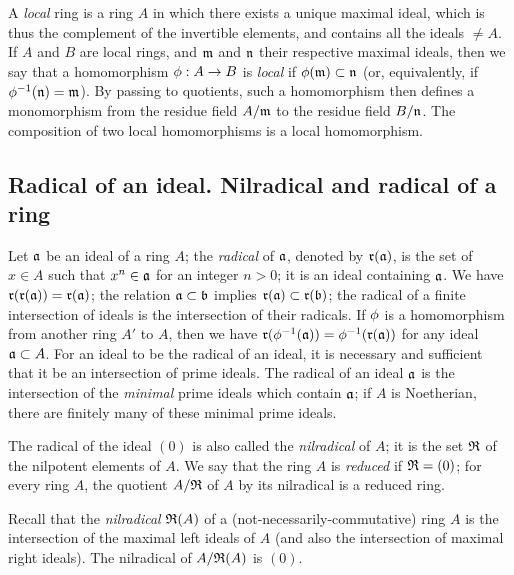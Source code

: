 \begin{env}[1.0.7]
\label{0.1.0.7}
A \emph{local} ring is a ring $A$ in which there exists a unique maximal ideal, which is thus the complement of the invertible elements, and contains all the ideals $\neq A$.
If $A$ and $B$ are local rings, and $\mathfrak{m}$ and $\mathfrak{n}$ their respective maximal ideals, then we say that a homomorphism $\vphi:A\to B$ is \emph{local} if $\phi(\mathfrak{m})\subset\mathfrak{n}$ (or, equivalently, if $\phi^{-1}(\mathfrak{n})=\mathfrak{m}$).
By passing to quotients, such a homomorphism then defines a monomorphism from the residue field $A/\mathfrak{m}$ to the residue field $B/\mathfrak{n}$.
The composition of two local homomorphisms is a local homomorphism.
\end{env}

\subsection{Radical of an ideal. Nilradical and radical of a ring}
\label{subsection-radical-and-nilradical}

\begin{env}[1.1.1]
\label{0.1.1.1}
Let $\mathfrak{a}$ be an ideal of a ring $A$;
the \emph{radical} of $\mathfrak{a}$, denoted by $\mathfrak{r}(\mathfrak{a})$, is the set of $x\in A$ such that $x^n\in\mathfrak{a}$ for an integer $n>0$;
it is an ideal containing $\mathfrak{a}$.
We have $\mathfrak{r}(\mathfrak{r}(\mathfrak{a}))=\mathfrak{r}(\mathfrak{a})$;
the relation $\mathfrak{a}\subset\mathfrak{b}$ implies $\mathfrak{r}(\mathfrak{a})\subset\mathfrak{r}(\mathfrak{b})$;
the radical of a finite intersection of ideals is the intersection of their radicals.
If $\phi$ is a homomorphism from another ring $A'$ to $A$, then we have $\mathfrak{r}(\phi^{-1}(\mathfrak{a}))=\phi^{-1}(\mathfrak{r}(\mathfrak{a}))$ for any ideal $\mathfrak{a}\subset A$.
For an ideal to be the radical of an ideal, it is necessary and sufficient that it be an intersection of prime ideals.
The radical of an ideal $\mathfrak{a}$ is the intersection of the \emph{minimal} prime ideals which contain $\mathfrak{a}$;
if $A$ is Noetherian, there are finitely many of these minimal prime ideals.

The radical of the ideal $(0)$ is also called the \emph{nilradical} of $A$;
it is the set $\mathfrak{R}$ of the nilpotent elements of $A$.
We say that the ring $A$ is \emph{reduced} if $\mathfrak{R}=(0)$;
for every ring $A$, the quotient $A/\mathfrak{R}$ of $A$ by its nilradical is a reduced ring.
\end{env}

\begin{env}[1.1.2]
\label{0.1.1.2}
Recall that the \emph{nilradical} $\mathfrak{R}(A)$ of a (not-necessarily-commutative) ring $A$ is the intersection of the maximal left ideals of $A$ (and also the intersection of maximal right ideals).
The nilradical of $A/\mathfrak{R}(A)$ is $(0)$.
\end{env}

